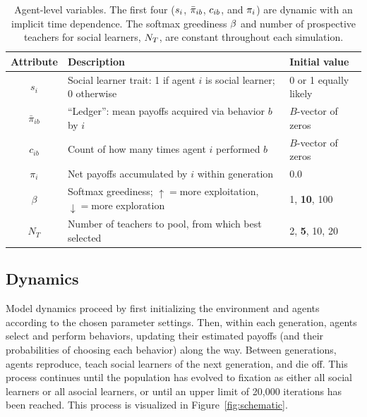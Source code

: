\documentclass[letterpaper,11.5pt]{scrartcl}
\begin{document}
\begin{table}[h]
  \vspace{2em}
  \caption{Agent-level variables. The first four ($\protect s_i$, $\protect
    \bar\pi_{ib}$, $\protect c_{ib}$,
  and $\protect \pi_i$) are dynamic with an implicit time dependence. The softmax
greediness $\protect \beta$ and number of prospective teachers for social learners,
$\protect N_T$, are constant throughout each simulation.}
    \label{tab:modelParameters}
    \centering %
    \begin{tabular}{cp{4.0in}p{1.25in}} \toprule

        Attribute & Description & Initial value \\ 

        \midrule  

        $s_i$  & Social learner trait: 1 if agent $i$ is social learner; 0 otherwise & 0
        or 1 equally likely \\

        $\bar\pi_{ib}$ & ``Ledger'': mean payoffs acquired via behavior $b$ by $i$ 
                       & $B$-vector of zeros \\

        $c_{ib}$ & Count of how many times agent $i$ performed $b$ 
              & $B$-vector of zeros \\

        $\pi_i$ & Net payoffs accumulated by $i$ within generation & 0.0 \\

        $\beta$ & Softmax greediness; $\uparrow=$more exploitation, $\downarrow=$more
                    exploration 
               & 1, \textbf{10}, 100 \\
        
        $N_T$    & Number of teachers to pool, from which best selected 
                 & 2, \textbf{5}, 10, 20  \\

        \bottomrule
    \end{tabular}
\end{table}



\subsection{Dynamics}

Model dynamics proceed by first initializing the environment and agents according
to the chosen parameter settings. %
Then, within each generation, agents select and perform behaviors, updating their estimated payoffs (and their probabilities of choosing each behavior) along the way.
Between generations, agents reproduce, teach social learners of the next generation, and die off. 
This process continues until the population has evolved to fixation as either all social learners or all asocial learners, or until an upper limit of 20,000 
iterations has been reached. This process is visualized in
Figure~\ref{fig:schematic}.
\end{document}

